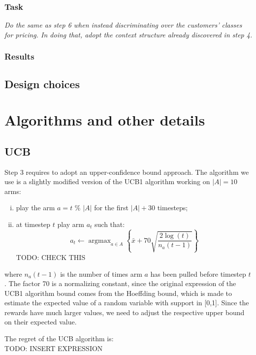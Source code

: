 \documentclass[12pt,a4paper]{report}
\DeclareMathOperator*{\argmax}{argmax}
\begin{document}
			\subsection{Task}
\textit{Do the same as step 6 when instead discriminating over the customers’ classes for pricing. In doing that, adopt the context structure already discovered in step 4.}
			\subsection{Results}
		\section{Design choices}

	\chapter{Algorithms and other details}
		\section{UCB}
Step 3 requires to adopt an upper-confidence bound approach. The algorithm we use is a slightly modified version of the UCB1 algorithm working on $|A|=10$ arms:
\begin{enumerate}[i)]
	\item play the arm $a=t$  $\%$  $|A|$ for the first $|A|+30$ timesteps;
	\item at timestep $t$ play arm $a_t$ such that:
		$$a_t \leftarrow \argmax_{a \in A} \left\{\bar x + 70 \sqrt{\frac{2 \log(t)}{n_a(t-1)}}\right\} $$
TODO: CHECK THIS
\end{enumerate}
where $n_a(t-1)$ is the number of times arm $a$ has been pulled before timestep $t$. The factor 70 is a normalizing constant, since the original expression of the UCB1 algorithm bound comes from the Hoeffding bound, which is made to estimate the expected value of a random variable with support in [0,1]. Since the rewards have much larger values, we need to adjust the respective upper bound on their expected value.

The regret of the UCB algorithm is: \\TODO: INSERT EXPRESSION
\end{document}
